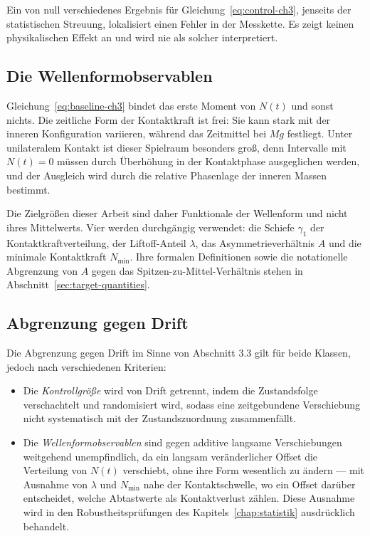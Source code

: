\documentclass[12pt,a4paper]{report}
\begin{document}
Ein von null verschiedenes Ergebnis für
Gleichung~\eqref{eq:control-ch3}, jenseits der statistischen Streuung,
lokalisiert einen Fehler in der Messkette. Es zeigt keinen
physikalischen Effekt an und wird nie als solcher interpretiert.

\subsection{Die Wellenformobservablen}

Gleichung~\eqref{eq:baseline-ch3} bindet das erste Moment von $N(t)$ und
sonst nichts. Die zeitliche Form der Kontaktkraft ist frei: Sie kann
stark mit der inneren Konfiguration variieren, während das Zeitmittel bei
$Mg$ festliegt. Unter unilateralem Kontakt ist dieser Spielraum besonders
groß, denn Intervalle mit $N(t) = 0$ müssen durch Überhöhung in der
Kontaktphase ausgeglichen werden, und der Ausgleich wird durch die
relative Phasenlage der inneren Massen bestimmt.

Die Zielgrößen dieser Arbeit sind daher Funktionale der Wellenform und
nicht ihres Mittelwerts. Vier werden durchgängig verwendet: die Schiefe
$\gamma_1$ der Kontaktkraftverteilung, der Liftoff-Anteil $\lambda$, das
Asymmetrieverhältnis $A$ und die minimale Kontaktkraft $N_{\min}$. Ihre
formalen Definitionen sowie die notationelle Abgrenzung von $A$ gegen das
Spitzen-zu-Mittel-Verhältnis stehen in
Abschnitt~\ref{sec:target-quantities}.

\subsection{Abgrenzung gegen Drift}

Die Abgrenzung gegen Drift im Sinne von Abschnitt 3.3 gilt für beide
Klassen, jedoch nach verschiedenen Kriterien:

\begin{itemize}
  \item Die \emph{Kontrollgröße} wird von Drift getrennt, indem die
        Zustandsfolge verschachtelt und randomisiert wird, sodass eine
        zeitgebundene Verschiebung nicht systematisch mit der
        Zustandszuordnung zusammenfällt.
  \item Die \emph{Wellenformobservablen} sind gegen additive langsame
        Verschiebungen weitgehend unempfindlich, da ein langsam
        veränderlicher Offset die Verteilung von $N(t)$ verschiebt, ohne
        ihre Form wesentlich zu ändern --- mit Ausnahme von $\lambda$ und
        $N_{\min}$ nahe der Kontaktschwelle, wo ein Offset darüber
        entscheidet, welche Abtastwerte als Kontaktverlust zählen. Diese
        Ausnahme wird in den Robustheitsprüfungen des Kapitels~\ref{chap:statistik}
        ausdrücklich behandelt.
\end{itemize}
\end{document}

